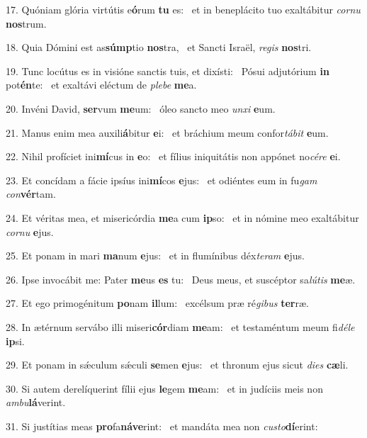 17. Quóniam glória virtútis e\textbf{ó}rum \textbf{tu} es: \ast\  et in beneplácito tuo exaltábitur \textit{cor}\textit{nu} \textbf{nos}trum.\

18. Quia Dómini est as\textbf{súmp}tio \textbf{nos}tra, \ast\  et Sancti Israël, \textit{re}\textit{gis} \textbf{nos}tri.\

19. Tunc locútus es in visióne sanctis tuis, et dixísti: \dag\  Pósui adjutórium \textbf{in} pot\textbf{én}te: \ast\  et exaltávi eléctum de \textit{ple}\textit{be} \textbf{me}a.\

20. Invéni David, \textbf{ser}vum \textbf{me}um: \ast\  óleo sancto meo \textit{un}\textit{xi} \textbf{e}um.\

21. Manus enim mea auxili\textbf{á}bitur \textbf{e}i: \ast\  et bráchium meum confor\textit{tá}\textit{bit} \textbf{e}um.\

22. Nihil profíciet ini\textbf{mí}cus in \textbf{e}o: \ast\  et fílius iniquitátis non appónet no\textit{cé}\textit{re} \textbf{e}i.\

23. Et concídam a fácie ipsíus ini\textbf{mí}cos \textbf{e}jus: \ast\  et odiéntes eum in fu\textit{gam} \textit{con}\textbf{vér}tam.\

24. Et véritas mea, et misericórdia \textbf{me}a cum \textbf{ip}so: \ast\  et in nómine meo exaltábitur \textit{cor}\textit{nu} \textbf{e}jus.\

25. Et ponam in mari \textbf{ma}num \textbf{e}jus: \ast\  et in flumínibus déx\textit{te}\textit{ram} \textbf{e}jus.\

26. Ipse invocábit me: Pater \textbf{me}us \textbf{es} tu: \ast\  Deus meus, et suscéptor sa\textit{lú}\textit{tis} \textbf{me}æ.\

27. Et ego primogénitum \textbf{po}nam \textbf{il}lum: \ast\  excélsum præ ré\textit{gi}\textit{bus} \textbf{ter}ræ.\

28. In ætérnum servábo illi miseri\textbf{cór}diam \textbf{me}am: \ast\  et testaméntum meum fi\textit{dé}\textit{le} \textbf{ip}si.\

29. Et ponam in sǽculum sǽculi \textbf{se}men \textbf{e}jus: \ast\  et thronum ejus sicut \textit{di}\textit{es} \textbf{cæ}li.\

30. Si autem derelíquerint fílii ejus \textbf{le}gem \textbf{me}am: \ast\  et in judíciis meis non \textit{am}\textit{bu}\textbf{lá}verint.\

31. Si justítias meas \textbf{pro}fa\textbf{ná}\textbf{ve}rint: \ast\  et mandáta mea non \textit{cus}\textit{to}\textbf{dí}erint:\

